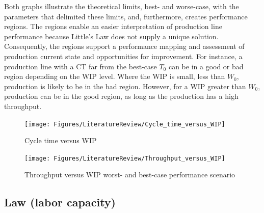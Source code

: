 \documentclass{article}
\begin{document}
Both graphs illustrate the theoretical limits, best- and worse-case, with the parameters that delimited these limits, and, furthermore, creates performance regions.
The regions enable an easier interpretation of production line performance because Little's Law does not supply a unique solution.
Consequently, the regions support a performance mapping and assessment of production current state and opportunities for improvement.
For instance, a production line with a CT far from the best-case \(T_0\) can be in a good or bad region depending on the WIP level.
Where the WIP is small, less than \(W_0\), production is likely to be in the bad region.
However, for a WIP greater than \(W_0\), production can be in the good region, as long as the production has a high throughput.

\begin{figure}[H]
  \centering
  \texttt{[image: Figures/LiteratureReview/Cycle\_time\_versus\_WIP]}
  \caption{Cycle time versus WIP}\label{fig:Cycle time versus WIP}
\end{figure}

\begin{figure}[H]
  \centering
  \texttt{[image: Figures/LiteratureReview/Throughput\_versus\_WIP]}
  \caption{Throughput versus WIP worst- and best-case performance scenario}\label{fig:throughput versus WIP worst- and best-case performance scenario}
\end{figure}

\subsection{Law (labor capacity)}
\end{document}
